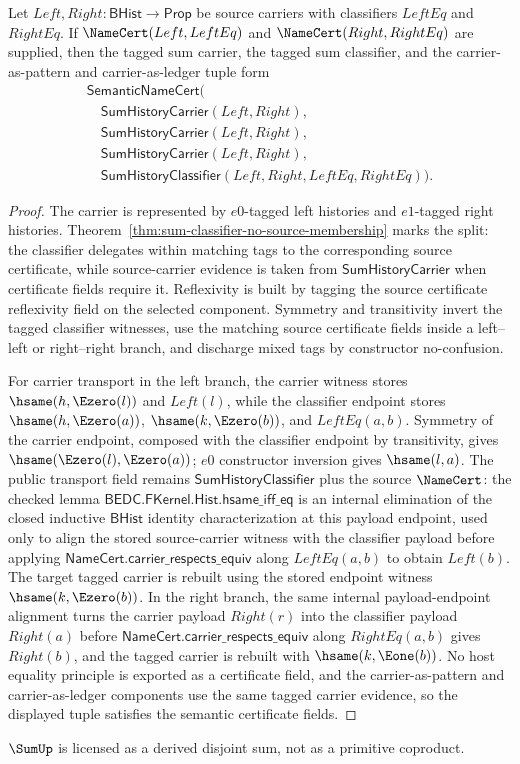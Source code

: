 \begin{theorem}
\label{thm:concrete-sum-namecert}
Let $Left,Right:\mathsf{BHist}\to\mathsf{Prop}$ be source carriers with classifiers
$LeftEq$ and $RightEq$. If $\NameCert(Left,LeftEq)$ and
$\NameCert(Right,RightEq)$ are supplied, then the tagged sum carrier, the tagged
sum classifier, and the carrier-as-pattern and carrier-as-ledger tuple form
$$
\begin{array}{l}
\mathsf{SemanticNameCert}( \\
\quad \mathsf{SumHistoryCarrier}(Left,Right), \\
\quad \mathsf{SumHistoryCarrier}(Left,Right), \\
\quad \mathsf{SumHistoryCarrier}(Left,Right), \\
\quad \mathsf{SumHistoryClassifier}(Left,Right,LeftEq,RightEq)).
\end{array}
$$
\end{theorem}
\begin{proof}
The carrier is represented by $e0$-tagged left histories and $e1$-tagged right histories. Theorem~\ref{thm:sum-classifier-no-source-membership} marks the split: the classifier delegates within matching tags to the corresponding source certificate, while source-carrier evidence is taken from $\mathsf{SumHistoryCarrier}$ when certificate fields require it. Reflexivity is built by tagging the source certificate reflexivity field on the selected component. Symmetry and transitivity invert the tagged classifier witnesses, use the matching source certificate fields inside a left--left or right--right branch, and discharge mixed tags by constructor no-confusion.

For carrier transport in the left branch, the carrier witness stores $\hsame(h,\Ezero(l))$ and $Left(l)$, while the classifier endpoint stores $\hsame(h,\Ezero(a))$, $\hsame(k,\Ezero(b))$, and $LeftEq(a,b)$. Symmetry of the carrier endpoint, composed with the classifier endpoint by transitivity, gives $\hsame(\Ezero(l),\Ezero(a))$; $e0$ constructor inversion gives $\hsame(l,a)$. The public transport field remains $\mathsf{SumHistoryClassifier}$ plus the source $\NameCert$: the checked lemma $\mathsf{BEDC.FKernel.Hist.hsame\_iff\_eq}$ is an internal elimination of the closed inductive $\mathsf{BHist}$ identity characterization at this payload endpoint, used only to align the stored source-carrier witness with the classifier payload before applying $\mathsf{NameCert.carrier\_respects\_equiv}$ along $LeftEq(a,b)$ to obtain $Left(b)$. The target tagged carrier is rebuilt using the stored endpoint witness $\hsame(k,\Ezero(b))$. In the right branch, the same internal payload-endpoint alignment turns the carrier payload $Right(r)$ into the classifier payload $Right(a)$ before $\mathsf{NameCert.carrier\_respects\_equiv}$ along $RightEq(a,b)$ gives $Right(b)$, and the tagged carrier is rebuilt with $\hsame(k,\Eone(b))$. No host equality principle is exported as a certificate field, and the carrier-as-pattern and carrier-as-ledger components use the same tagged carrier evidence, so the displayed tuple satisfies the semantic certificate fields.
\end{proof}

\begin{corollary}
\label{cor:sum-licensed-not-primitive}
\(\SumUp\) is licensed as a derived disjoint sum, not as a primitive coproduct.
\end{corollary}
